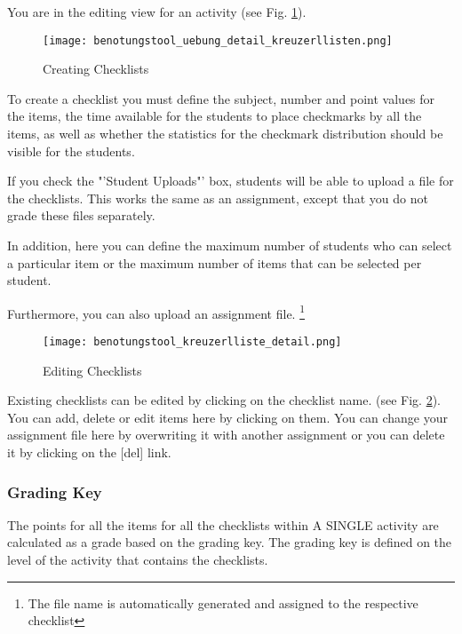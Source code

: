 You are in the editing view for an activity (see Fig. \ref{uebung_detail_kreuzerllisten}).

\begin{figure}[ht]
\begin{center}
\texttt{[image: benotungstool\_uebung\_detail\_kreuzerllisten.png]}
\end{center}
\caption{Creating Checklists}\label{uebung_detail_kreuzerllisten}
\end{figure}


To create a checklist you must define the subject, number and point values for the items, the time available for the students to place checkmarks by all the items, as well as whether the statistics for the checkmark distribution should be visible for the students.

If you check the "'Student Uploads"' box, students will be able to upload a file for the checklists. This works the same as an assignment, except that you do not grade these files separately.

In addition, here you can define the maximum number of students who can select a particular item or the maximum number of items that can be selected per student.

Furthermore, you can also upload an assignment file. \footnote{The file name is automatically generated and assigned to the respective checklist}


\begin{figure}[ht]
\begin{center}
\texttt{[image: benotungstool\_kreuzerlliste\_detail.png]}
\end{center}
\caption{Editing Checklists}\label{kreuzerlliste_detail}
\end{figure}

Existing checklists can be edited by clicking on the checklist name. (see Fig. \ref{kreuzerlliste_detail}). You can add, delete or edit items here by clicking on them. You can change your assignment file here by overwriting it with another assignment or you can delete it by clicking on the [del] link.

\subsubsection{Grading Key}
\label{kap_notenschluessel}
The points for all the items for all the checklists within A SINGLE activity are calculated as a grade based on the grading key.
The grading key is defined on the level of the activity that contains the checklists. 


